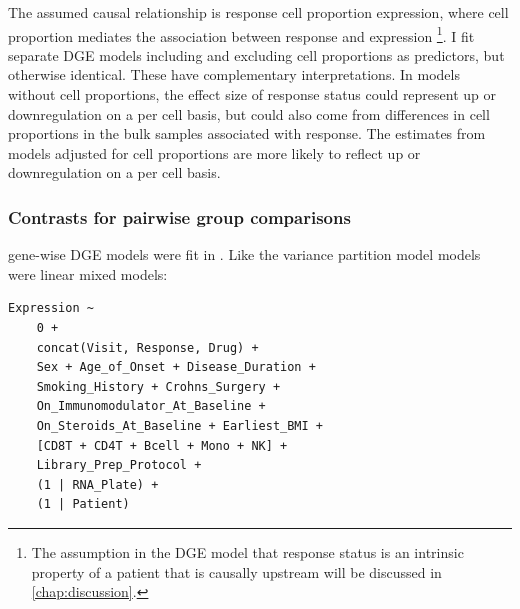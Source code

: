 The assumed causal relationship is response \textrightarrow cell proportion \textrightarrow expression, 
where cell proportion mediates the association between response and expression \footnote{
    The assumption in the \gls{DGE} model that response status is an intrinsic property of a patient that is causally upstream will be discussed in \autoref{chap:discussion}.
}.
I fit separate \gls{DGE} models including and excluding cell proportions as predictors, but otherwise identical.
These have complementary interpretations.
In models without cell proportions, the effect size of response status could represent up or downregulation on a per cell basis, 
but could also come from differences in cell proportions in the bulk samples associated with response.
The estimates from models adjusted for cell proportions are more likely to reflect up or downregulation on a per cell basis.


\subsubsection{Contrasts for pairwise group comparisons}

gene-wise \gls{DGE} models were fit in  \autocite{hoffman2020DreamPowerfulDifferential}.
Like the variance partition model models were linear mixed models:

\begin{lstlisting}
Expression ~ 
    0 + 
    concat(Visit, Response, Drug) + 
    Sex + Age_of_Onset + Disease_Duration + 
    Smoking_History + Crohns_Surgery + 
    On_Immunomodulator_At_Baseline + 
    On_Steroids_At_Baseline + Earliest_BMI +
    [CD8T + CD4T + Bcell + Mono + NK] + 
    Library_Prep_Protocol +
    (1 | RNA_Plate) +
    (1 | Patient)
\end{lstlisting}

